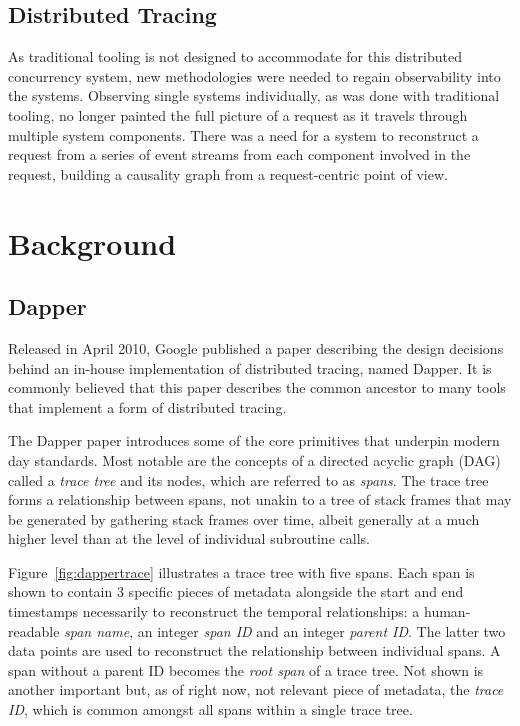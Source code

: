 \documentclass[12pt,pdftex,titlepage]{report}
\begin{document}
        \section{Distributed Tracing}
            As traditional tooling is not designed to accommodate for this distributed concurrency system, new methodologies were needed to regain observability into the systems.
            Observing single systems individually, as was done with traditional tooling, no longer painted the full picture of a request as it travels through multiple system 
            components. There was a need for a system to reconstruct a request from a series of event streams from each component involved in the request, building a causality
            graph from a request-centric point of view. 

    \chapter{Background}
        \section{Dapper}
        Released in April 2010, Google published a paper describing the design decisions behind an in-house implementation 
        of distributed tracing, named Dapper. It is commonly believed that this paper describes the common ancestor to 
        many tools that implement a form of distributed tracing.

        The Dapper paper introduces some of the core primitives that underpin modern day standards. Most notable are the concepts
        of a directed acyclic graph (DAG) called a \textit{trace tree} and its nodes, which are referred to as \textit{spans}. 
        The trace tree forms a relationship between spans, not unakin to a tree of stack frames that may be generated by
        gathering stack frames over time, albeit generally at a much higher level than at the level of individual subroutine calls. 

        Figure~\ref{fig:dappertrace} illustrates a trace tree with five spans. Each span is shown to contain 3 specific pieces of
        metadata alongside the start and end timestamps necessarily to reconstruct the temporal relationships: a human-readable
        \textit{span name}, an integer \textit{span ID} and an integer \textit{parent ID}. The latter two
        data points are used to reconstruct the relationship between individual spans. A span without a parent ID becomes the 
        \textit{root span} of a trace tree. Not shown is another important but, as of right now, not relevant piece of metadata, the 
        \textit{trace ID}, which is common amongst all spans within a single trace tree.
\end{document}
